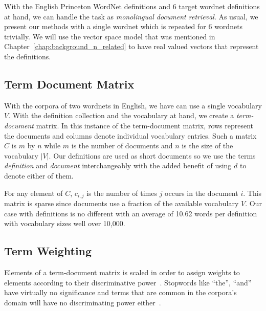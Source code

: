With the English Princeton WordNet definitions and 6 target wordnet definitions at hand, we can handle the task as \emph{monolingual document retrieval}.
As usual, we present our methods with a single wordnet which is repeated for 6 wordnets trivially.
We will use the vector space model that was mentioned in Chapter~\ref{chap:background_n_related} to have real valued vectors that represent the definitions.

\subsection{Term Document Matrix}%
\label{sub:term_document_matrix}

With the corpora of two wordnets in English, we have can use a single vocabulary $V$.
With the definition collection and the vocabulary at hand, we create a \emph{term-document} matrix.
In this instance of the term-document matrix, rows represent the documents and columns denote individual vocabulary entries.
Such a matrix $C$ is $m$ by $n$ while $m$ is the number of documents and $n$ is the size of the vocabulary $|V|$.
Our definitions are used as short documents so we use the terms \emph{definition} and \emph{document} interchangeably with the added benefit of using $d$ to denote either of them.

For any element of $C$, $c_{i,j}$ is the number of times $j$ occurs in the document $i$.
This matrix is sparse since documents use a fraction of the available vocabulary $V$.
Our case with definitions is no different with an average of 10.62 words per definition with vocabulary sizes well over 10,000.

\subsection{Term Weighting}%
\label{sub:term_weighting}

Elements of a term-document matrix is scaled in order to assign weights to elements according to their discriminative power~\cite{manning_introduction_2009}.
Stopwords like \enquote{the}, \enquote{and} have virtually no significance and terms that are common in the corpora's domain will have no discriminating power either~\cite{manning_introduction_2009}.

